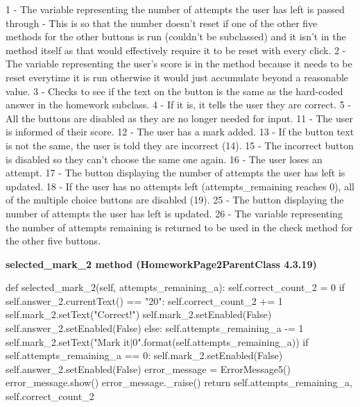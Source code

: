 1 - The variable representing the number of attempts the user has left is passed through - This is so that the number doesn't reset if one of the other five methods for the other buttons is run (couldn't be subclassed) and it isn't in the method itself as that would effectively require it to be reset with every click.
2 - The variable representing the user's score is in the method because it needs to be reset everytime it is run otherwise it would just accumulate beyond a reasonable value.
3 - Checks to see if the text on the button is the same as the hard-coded answer in the homework subclass.
4 - If it is, it tells the user they are correct.
5 - All the buttons are disabled as they are no longer needed for input.
11 - The user is informed of their score.
12 - The user has a mark added.
13 - If the button text is not the same, the user is told they are incorrect (14).
15 - The incorrect button is disabled so they can't choose the same one again.
16 - The user loses an attempt.
17 - The button displaying the number of attempts the user has left is updated.
18 - If the user has no attempts left (attempts\_remaining reaches 0), all of the multiple choice buttons are disabled (19).
25 - The button displaying the number of attempts the user has left is updated.
26 - The variable representing the number of attempts remaining is returned to be used in the check method for the other five buttons.

\textbf{selected\_mark\_2 method (HomeworkPage2ParentClass 4.3.19)}

\begin{python}
def selected_mark_2(self, attempts_remaining_a):
        self.correct_count_2 = 0
        if self.answer_2.currentText() == "20":
            self.correct_count_2 += 1
            self.mark_2.setText("Correct!")
            self.mark_2.setEnabled(False)
            self.answer_2.setEnabled(False)
        else:
            self.attempts_remaining_a -= 1
            self.mark_2.setText("Mark it|{0}".format(self.attempts_remaining_a))
            if self.attempts_remaining_a == 0:
                self.mark_2.setEnabled(False)
                self.answer_2.setEnabled(False)
            error_message = ErrorMessage5()
            error_message.show()
            error_message._raise()
        return self.attempts_remaining_a, self.correct_count_2
\end{python}

